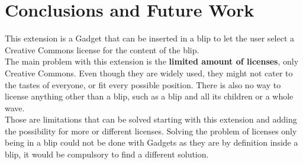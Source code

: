 \section{Conclusions and Future Work}
This extension is a Gadget that can be inserted in a blip to let the user select a Creative Commons license for the content of the blip.\\[.2cm]
The main problem with this extension is the \textbf{limited amount of licenses}, only Creative Commons. Even though they are widely used, they might not cater to the tastes of everyone, or fit every possible position. There is also no way to license anything other than a blip, such as a blip and all its children or a whole wave.\\[.2cm]
Those are limitations that can be solved starting with this extension and adding the possibility for more or different licenses. Solving the problem of licenses only being in a blip could not be done with Gadgets as they are by definition inside a blip, it would be compulsory to find a different solution.
\newpage
